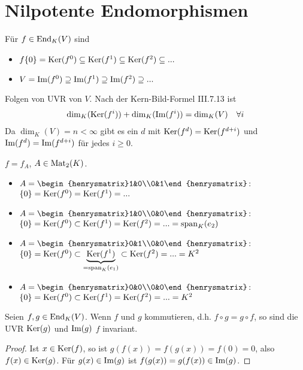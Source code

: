 \section{Nilpotente Endomorphismen}

\begin{remark}
	Für $f\in\operatorname{End}_K(V)$ sind 
	\begin{itemize}
		\item $f\{0\}=\operatorname{Ker}(f^0)\subseteq \operatorname{Ker}(f^1)\subseteq \operatorname{Ker}(f^2)\subseteq ...$
		\item $V=\operatorname{Im}(f^0)\supseteq \operatorname{Im}(f^1)\supseteq \operatorname{Im}(f^2)\supseteq ...$
	\end{itemize}
Folgen von UVR von $V$. Nach der Kern-Bild-Formel III.7.13 ist
\begin{align}
	\dim_K(\operatorname{Ker}(f^i))+\dim_K(\operatorname{Im}(f^i))=\dim_K(V)\quad\forall i\notag
\end{align}
Da $\dim_K(V)=n<\infty$ gibt es ein $d$ mit $\operatorname{Ker}(f^d)=\operatorname{Ker}(f^{d+i})$ und $\operatorname{Im}(f^d)=\operatorname{Im}(f^{d+i})$ für jedes $i\ge 0$.
\end{remark}

\begin{example}
	$f=f_A$, $A\in\operatorname{Mat}_2(K)$.
	\begin{itemize}
		\item $A=\begin{henrysmatrix}1&0\\0&1\end{henrysmatrix}$: $\{0\}=\operatorname{Ker}(f^0)=\operatorname{Ker}(f^1)=...$
		\item $A=\begin{henrysmatrix}1&0\\0&0\end{henrysmatrix}$: $\{0\}=\operatorname{Ker}(f^0)\subset\operatorname{Ker}(f^1)=\operatorname{Ker}(f^2)=...=\operatorname{span}_K(e_2)$
		\item $A=\begin{henrysmatrix}0&1\\0&0\end{henrysmatrix}$: $\{0\}=\operatorname{Ker}(f^0)\subset\underbrace{\operatorname{Ker}(f^1)}_{=\operatorname{span}_K(e_1)}\subset \operatorname{Ker}(f^2)=... = K^2$
		\item $A=\begin{henrysmatrix}0&0\\0&0\end{henrysmatrix}$: $\{0\}=\operatorname{Ker}(f^0)\subset\operatorname{Ker}(f^1)=\operatorname{Ker}(f^2)=...=K^2$
	\end{itemize}
\end{example}

\begin{lemma}
	Seien $f,g\in\operatorname{End}_K(V)$. Wenn $f$ und  $g$ kommutieren, d.h. $f\circ g=g\circ f$, so sind die UVR $\operatorname{Ker}(g)$ und $\operatorname{Im}(g)$ $f$ invariant.
\end{lemma}
\begin{proof}
	Ist $x\in\operatorname{Ker}(f)$, so ist $g(f(x))=f(g(x))=f(0)=0$, also $f(x)\in\operatorname{Ker}(g)$. Für $g(x)\in\operatorname{Im}(g)$ ist $f(g(x))=g(f(x))\in\operatorname{Im}(g)$.
\end{proof}

